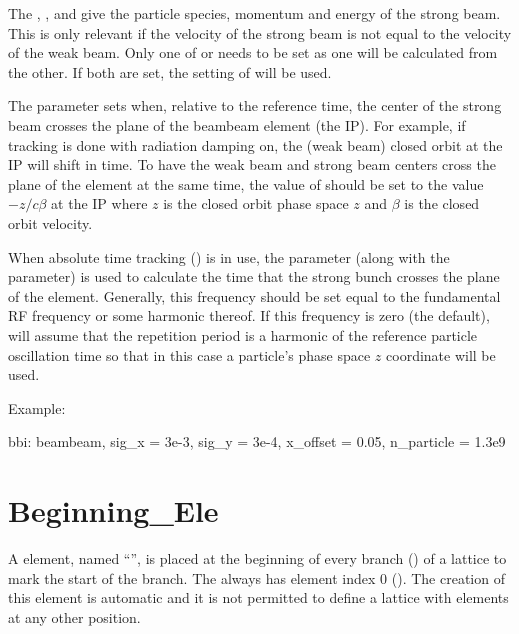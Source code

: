 The , , and  give the particle species, momentum
and energy of the strong beam. This is only relevant if the velocity of the strong beam is
not equal to the velocity of the weak beam. Only one of  or  needs
to be set as one will be calculated from the other. If both are set, the setting of 
will be used.

The  parameter sets when, relative to the reference time, the center of the strong
beam crosses the plane of the beambeam element (the IP).  For example, if tracking is done with
radiation damping on, the (weak beam) closed orbit at the IP will shift in time. To have the weak
beam and strong beam centers cross the plane of the  element at the same time, the
value of  should be set to the value $-z/c\beta$ at the IP where $z$ is the closed
orbit phase space $z$ and $\beta$ is the closed orbit velocity.

When absolute time tracking () is in use, the 
parameter (along with the  parameter) is used to calculate the time that the strong
bunch crosses the plane of the  element. Generally, this frequency should be set equal
to the fundamental RF frequency or some harmonic thereof. If this frequency is zero (the default),
\bmad will assume that the repetition period is a harmonic of the reference particle oscillation
time so that in this case a particle's phase space $z$ coordinate will be used.

Example:
\begin{example}
  bbi: beambeam, sig_x = 3e-3, sig_y = 3e-4, x_offset = 0.05, n_particle = 1.3e9
\end{example}

\newpage

\section{Beginning_Ele}
\label{s:begin.ele}

A  element, named ``'', is placed at the beginning of every branch
() of a lattice to mark the start of the branch. The  always
has element index 0 (). The creation of this  element is
automatic and it is not permitted to define a lattice with  elements at any
other position.

